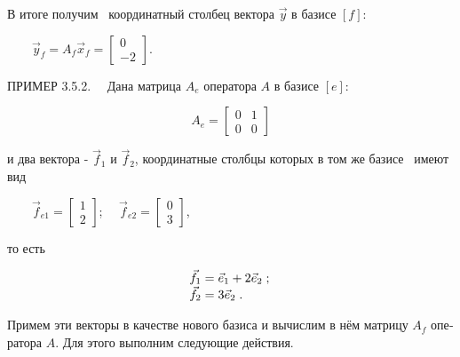 \documentclass[a4paper]{article}
\begin{document}
{\begin{russian}\sffamily
В итоге получим \ координатный столбец вектора  $\vec y$ в базисе  $[f]$:
\end{russian}}

{\begin{russian}\sffamily
\ \ \ \  $\vec y_f=A_f\vec x_f=\left[\begin{matrix}0\\-2\end{matrix}\right]$.
\end{russian}}


\bigskip

{\begin{russian}\sffamily
ПРИМЕР 3.5.2. \ \ Дана матрица  $A_e$ оператора  $A$ в базисе  $[e]$:
\end{russian}}

\begin{equation*}
A_e=\left[\begin{matrix}0&1\\0&0\end{matrix}\right]
\end{equation*}
{\begin{russian}\sffamily
и два вектора -  $\vec f_1$ и  $\vec f_2$, координатные столбцы которых в том же базисе \ имеют вид
\end{russian}}

{\begin{russian}\sffamily
\ \ \ \  $\vec f_{\mathit{e1}}=\left[\begin{matrix}1\\2\end{matrix}\right]$; \ \  $\vec
f_{\mathit{e2}}=\left[\begin{matrix}0\\3\end{matrix}\right]$,
\end{russian}}

{\begin{russian}\sffamily
то есть
\end{russian}}

\begin{equation*}
\begin{matrix}\vec f_1=\vec e_1+2\vec e_2\;;\hfill\null \\\vec f_2=3\vec e_2\;.\hfill\null \end{matrix}\hfill 
\end{equation*}
{\begin{russian}\sffamily
Примем эти векторы в качестве нового базиса и вычислим в нём матрицу  $A_f$ оператора  $A$. Для этого выполним следующие
действия.
\end{russian}}
\end{document}
